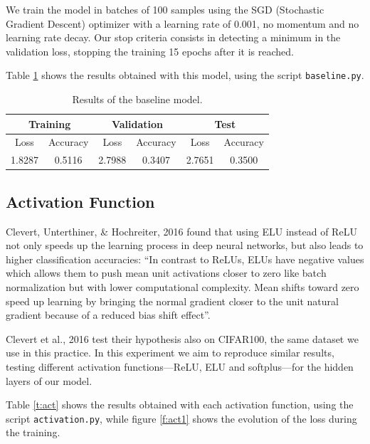 \documentclass[]{article}
\begin{document}
We train the model in batches of 100 samples using the SGD (Stochastic Gradient Descent) optimizer with a learning rate of 0.001, no momentum and no learning rate decay. Our stop criteria consists in detecting a minimum in the validation loss, stopping the training 15 epochs after it is reached.

Table \ref{t:baseline} shows the results obtained with this model, using the script \texttt{baseline.py}.

\begin{table}[H]
	\centering
	\label{t:baseline}
	\begin{tabular}{@{}cccccc@{}}
		\toprule
		\multicolumn{2}{c}{Training} & \multicolumn{2}{c}{Validation} & \multicolumn{2}{c}{Test} \\ \midrule
		Loss         & Accuracy      & Loss          & Accuracy       & Loss       & Accuracy    \\
		\midrule
		1.8287       & 0.5116        & 2.7988        & 0.3407         & 2.7651     & 0.3500      \\ \bottomrule
	\end{tabular}
	\caption{Results of the baseline model.}
\end{table}

\subsection{Activation Function}

Clevert, Unterthiner, \& Hochreiter, 2016 \cite{clevert2015fast} found that using ELU instead of ReLU not only speeds up the learning process in deep neural networks, but also leads to higher classification accuracies: ``In contrast to ReLUs, ELUs have negative values which allows them to push mean unit activations closer to zero like batch normalization but with lower computational complexity. Mean shifts toward zero speed up learning by bringing the normal gradient closer to the unit natural gradient because of a reduced bias shift effect''.

Clevert et al., 2016 test their hypothesis also on CIFAR100, the same dataset we use in this practice. In this experiment we aim to reproduce similar results, testing different activation functions---ReLU, ELU and softplus---for the hidden layers of our model.

Table \ref{t:act} shows the results obtained with each activation function, using the script \texttt{activation.py}, while figure \ref{f:act1} shows the evolution of the loss during the training.
\end{document}
